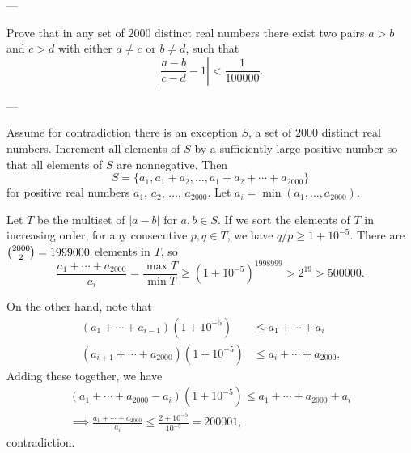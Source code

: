 
---

Prove that in any set of $2000$ distinct real numbers there exist two pairs $a>b$ and $c>d$ with either $a\ne c$ or $b\ne d$, such that \[\left\lvert\frac{a-b}{c-d}-1\right\rvert<\frac 1{100000}.\]

---

Assume for contradiction there is an exception $S$, a set of $2000$ distinct real numbers. Increment all elements of $S$ by a sufficiently large positive number so that all elements of $S$ are nonnegative. Then \[S=\{a_1,a_1+a_2,\ldots,a_1+a_2+\cdots+a_{2000}\}\]
for positive real numbers $a_1$, $a_2$, $\ldots$, $a_{2000}$. Let $a_i=\min(a_1,\ldots,a_{2000})$.

Let $T$ be the multiset of $|a-b|$ for $a,b\in S$. If we sort the elements of $T$ in increasing order, for any consecutive $p,q\in T$, we have $q/p\ge1+10^{-5}$. There are $\tbinom{2000}2=1999000$ elements in $T$, so \[\frac{a_1+\cdots+a_{2000}}{a_i}=\frac{\max T}{\min T}\ge\left(1+10^{-5}\right)^{1998999}>2^{19}>500000.\]

On the other hand, note that
\begin{align*}
    (a_1+\cdots+a_{i-1})\left(1+10^{-5}\right)&\le a_1+\cdots+a_i\\
    (a_{i+1}+\cdots+a_{2000})\left(1+10^{-5}\right)&\le a_i+\cdots+a_{2000}.
\end{align*}
Adding these together, we have
\begin{align*}
    (a_1+\cdots+a_{2000}-a_i)\left(1+10^{-5}\right)\le a_1+\cdots+a_{2000}+a_i\\
    \implies\frac{a_1+\cdots+a_{2000}}{a_i}\le\frac{2+10^{-5}}{10^{-5}}=200001,
\end{align*}
contradiction.

